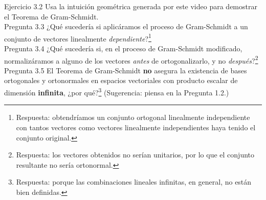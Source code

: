 \documentclass[12pt,dvipsnames]{article}
\numberwithin{equation}{section}
\begin{document}
Ejercicio 3.2 Usa la intuición geométrica generada por este video para demostrar el Teorema de Gram-Schmidt.\\

Pregunta 3.3 ¿Qué sucedería si aplicáramos el proceso de Gram-Schmidt a un conjunto de vectores linealmente \emph{dependiente}?\footnote{Respuesta: obtendríamos un conjunto ortogonal linealmente independiente con tantos vectores como vectores linealmente independientes haya tenido el conjunto original.} \\

Pregunta 3.4 ¿Qué sucedería si, en el proceso de Gram-Schmidt modificado, normalizáramos a alguno de los vectores \emph{antes} de ortogonalizarlo, y no \emph{después}?\footnote{Respuesta: los vectores obtenidos no serían unitarios, por lo que el conjunto resultante no sería ortonormal.} \\

Pregunta 3.5 El Teorema de Gram-Schmidt \textbf{no} asegura la existencia de bases ortogonales y ortonormales en espacios vectoriales con producto escalar de dimensión \textbf{infinita}, ¿por qué?\footnote{Respuesta: porque las combinaciones lineales infinitas, en general, no están bien definidas.} (Sugerencia: piensa en la Pregunta 1.2.)
\end{document}
